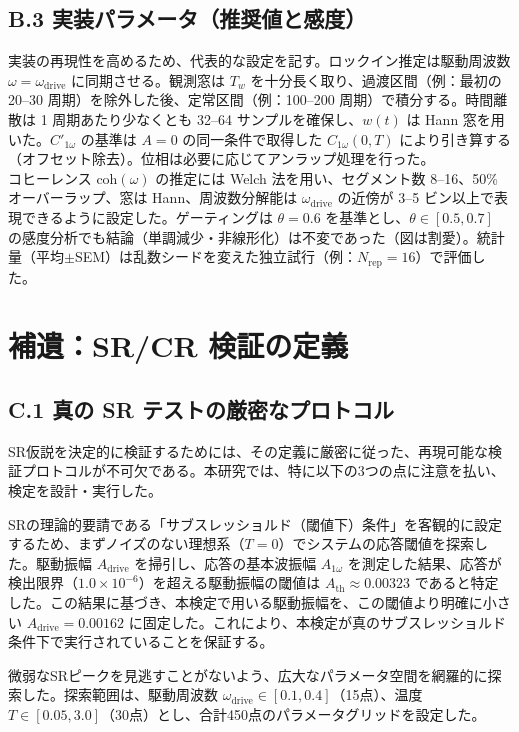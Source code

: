 \documentclass[a4paper,11pt,ja=standard,lualatex]{bxjsarticle}
\begin{document}
\subsection*{B.3 実装パラメータ（推奨値と感度）}
実装の再現性を高めるため、代表的な設定を記す。ロックイン推定は駆動周波数 $\omega=\omega_{\mathrm{drive}}$ に同期させる。観測窓は $T_w$ を十分長く取り、過渡区間（例：最初の 20--30 周期）を除外した後、定常区間（例：100--200 周期）で積分する。時間離散は 1 周期あたり少なくとも 32--64 サンプルを確保し、$w(t)$ は Hann 窓を用いた。$C'_{1\omega}$ の基準は $A=0$ の同一条件で取得した $C_{1\omega}(0,T)$ により引き算する（オフセット除去）。位相は必要に応じてアンラップ処理を行った。\\
コヒーレンス $\mathrm{coh}(\omega)$ の推定には Welch 法を用い、セグメント数 8--16、50\% オーバーラップ、窓は Hann、周波数分解能は $\omega_{\mathrm{drive}}$ の近傍が 3--5 ビン以上で表現できるように設定した。ゲーティングは $\theta=0.6$ を基準とし、$\theta\in[0.5,0.7]$ の感度分析でも結論（単調減少・非線形化）は不変であった（図は割愛）。統計量（平均$\pm$SEM）は乱数シードを変えた独立試行（例：$N_{\mathrm{rep}}=16$）で評価した。

\section{補遺：SR/CR 検証の定義}
\label{sec:appendixC}

\subsection*{C.1 真の SR テストの厳密なプロトコル}
SR仮説を決定的に検証するためには、その定義に厳密に従った、再現可能な検証プロトコルが不可欠である。本研究では、特に以下の3つの点に注意を払い、検定を設計・実行した。

SRの理論的要請である「サブスレッショルド（閾値下）条件」を客観的に設定するため、まずノイズのない理想系（$T=0$）でシステムの応答閾値を探索した。駆動振幅 $A_{\mathrm{drive}}$ を掃引し、応答の基本波振幅 $A_{1\omega}$ を測定した結果、応答が検出限界（$1.0\times 10^{-6}$）を超える駆動振幅の閾値は $A_{\mathrm{th}} \approx 0.00323$ であると特定した。この結果に基づき、本検定で用いる駆動振幅を、この閾値より明確に小さい $A_{\mathrm{drive}} = 0.00162$ に固定した。これにより、本検定が真のサブスレッショルド条件下で実行されていることを保証する。

微弱なSRピークを見逃すことがないよう、広大なパラメータ空間を網羅的に探索した。探索範囲は、駆動周波数 $\omega_{\mathrm{drive}} \in [0.1, 0.4]$（15点）、温度 $T \in [0.05, 3.0]$（30点）とし、合計450点のパラメータグリッドを設定した。
\end{document}
